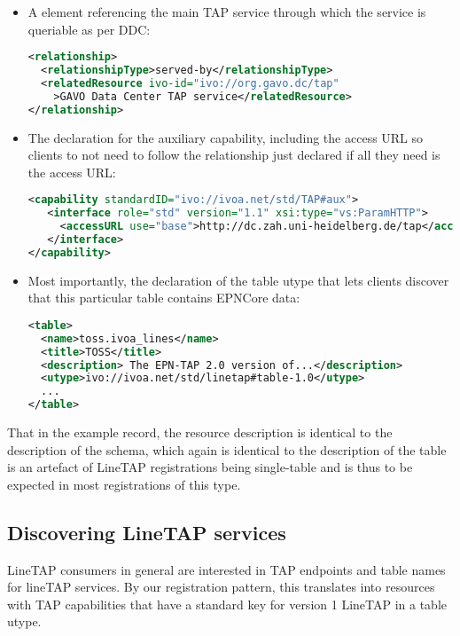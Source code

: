 \documentclass[11pt,a4paper]{ivoa}
\begin{document}
\begin{itemize}
\item A  element referencing the main TAP service 
through which the service is queriable as per DDC:
\begin{lstlisting}[language=XML,basicstyle=\footnotesize]
<relationship>
  <relationshipType>served-by</relationshipType>
  <relatedResource ivo-id="ivo://org.gavo.dc/tap"
    >GAVO Data Center TAP service</relatedResource>
</relationship>
\end{lstlisting}

\item The declaration for the auxiliary capability, including the access
URL so clients to not need to follow the relationship just declared if
all they need is the access URL:
\begin{lstlisting}[language=XML,basicstyle=\footnotesize]
<capability standardID="ivo://ivoa.net/std/TAP#aux">
   <interface role="std" version="1.1" xsi:type="vs:ParamHTTP">
     <accessURL use="base">http://dc.zah.uni-heidelberg.de/tap</accessURL>
   </interface>
</capability>
\end{lstlisting}

\item Most importantly, the declaration of the table utype that lets
clients discover that this particular table contains EPNCore data:
\begin{lstlisting}[language=XML,basicstyle=\footnotesize]
<table>
  <name>toss.ivoa_lines</name>
  <title>TOSS</title>
  <description> The EPN-TAP 2.0 version of...</description>
  <utype>ivo://ivoa.net/std/linetap#table-1.0</utype>
  ...
</table>
\end{lstlisting}
\end{itemize}

That in the example record, the resource description is identical to the
description of the schema, which again is identical to the description
of the table is an artefact of LineTAP registrations being single-table
and is thus to be expected in most registrations of this type.


\subsection{Discovering LineTAP services}

LineTAP consumers in general are interested in TAP endpoints and table names for
lineTAP services.  By our registration pattern, this translates into
resources with TAP capabilities that have a standard key for version 1
LineTAP in a table utype.
\end{document}
